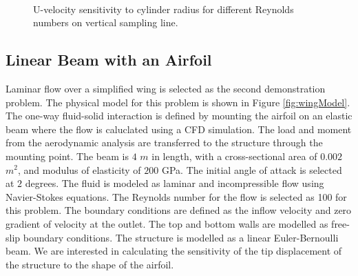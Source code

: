 \documentclass[12pt]{aiaa-pretty}
\begin{document}
\begin{figure}[H]
{	}
	\quad
	\\
	\quad
	\caption{U-velocity sensitivity to cylinder radius for different Reynolds numbers on vertical sampling line.}
	\label{fig:cylinderVelocitySensitivity}
\end{figure}
%

\subsection{Linear Beam with an Airfoil}
Laminar flow over a simplified wing is selected as the second demonstration problem. The physical model for this problem is shown in Figure \ref{fig:wingModel}. The one-way fluid-solid interaction is defined by mounting the airfoil on an elastic beam where the flow is caluclated using a CFD simulation. The load and moment from the aerodynamic analysis are transferred to the structure through the mounting point. The beam is $4$ $m$ in length, with a cross-sectional area of $0.002$ $m^2$, and modulus of elasticity of $200$ GPa. The initial angle of attack is selected at $2$ degrees. The fluid is modeled as laminar and incompressible flow using Navier-Stokes equations. The Reynolds number for the flow is selected as 100 for this problem. The boundary conditions are defined as the inflow velocity and zero gradient of velocity at the outlet. The top and bottom walls are modelled as free-slip boundary conditions. The structure is modelled as a linear Euler-Bernoulli beam. We are interested in calculating the sensitivity of the tip displacement of the structure to the shape of the airfoil.
\end{document}
